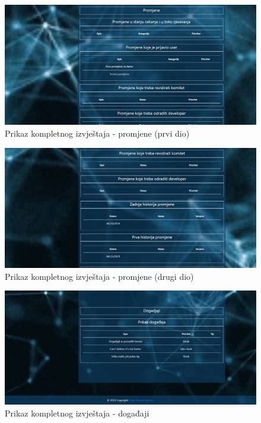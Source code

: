 \documentclass[12pt,a4paper]{article}
\begin{document}
\begin{figure}[H]
\center
\includegraphics[scale=0.35]{../res/UI/report2.PNG}
\caption{Prikaz kompletnog izvještaja - promjene (prvi dio)}
\label{s17}
\end{figure}

\begin{figure}[H]
\center
\includegraphics[scale=0.35]{../res/UI/report3.PNG}
\caption{Prikaz kompletnog izvještaja - promjene (drugi dio)}
\label{s18}
\end{figure}

\begin{figure}[H]
\center
\includegraphics[scale=0.35]{../res/UI/report4.PNG}
\caption{Prikaz kompletnog izvještaja - događaji}
\label{s19}
\end{figure}
\end{document}
